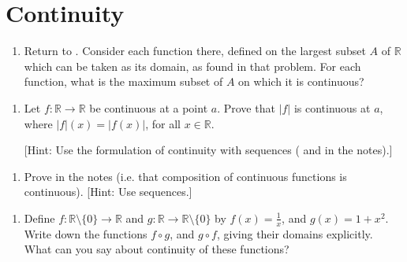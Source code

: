 \documentclass[letterpaper,10pt,english]{jupyterBook}
\begin{document}
\section{Continuity}
\label{\detokenize{Problems:continuity}}\label{\detokenize{Problems:ch3prob}}\label{\detokenize{Problems:id13}}\begin{enumerate}
%
\setcounter{enumi}{12}
\item {} 
\sphinxAtStartPar
Return to {\hyperref[\detokenize{Problems:id1}]{}}. Consider each function there, defined on the largest subset \(A\) of \(\mathbb{R}\)
which can be taken as its domain, as found in that problem. For each function, what is the maximum subset of \(A\) on which it is continuous?

\end{enumerate}
\label{\detokenize{Problems:id14}}\begin{enumerate}
%
\setcounter{enumi}{13}
\item {} 
\sphinxAtStartPar
Let \(f: \mathbb{R} \rightarrow \mathbb{R}\) be continuous at a point \(a\).
Prove that \(|f|\) is continuous at \(a\), where \(|f|(x) = |f(x)|\), for all \(x \in \mathbb{R}\).

{[}Hint: Use the formulation of continuity with sequences ( and  in the notes).{]}

\end{enumerate}
\label{\detokenize{Problems:id15}}\begin{enumerate}
%
\setcounter{enumi}{14}
\item {} 
\sphinxAtStartPar
Prove  in the notes (i.e. that composition of continuous functions is continuous). {[}Hint: Use sequences.{]}

\end{enumerate}
\label{\detokenize{Problems:id16}}\begin{enumerate}
%
\setcounter{enumi}{15}
\item {} 
\sphinxAtStartPar
Define \(f:\mathbb{R} \setminus \{0\}\to \mathbb{R}\) and \(g: \mathbb{R} \rightarrow \mathbb{R}\setminus \{0\}\) by \(f(x) = \frac{1}{x}\), and \(g(x) = 1 + x^{2}\). Write down the functions \(f \circ g\), and \(g \circ f\), giving their domains explicitly. What can you say about continuity of these functions?

\end{enumerate}
\end{document}
